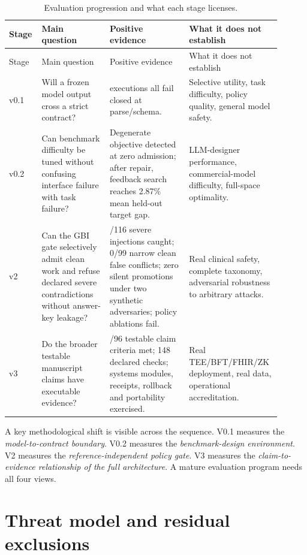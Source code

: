 \documentclass[11pt]{article}
\begin{document}
\small
\begin{longtable}{>{\RaggedRight\arraybackslash}p{0.10\linewidth} >{\RaggedRight\arraybackslash}p{0.24\linewidth} >{\RaggedRight\arraybackslash}p{0.28\linewidth} >{\RaggedRight\arraybackslash}p{0.28\linewidth}}
\caption{Evaluation progression and what each stage licenses.}\\
\toprule
Stage & Main question & Positive evidence & What it does not establish\\
\midrule
\endfirsthead
\toprule
Stage & Main question & Positive evidence & What it does not establish\\
\midrule
\endhead
v0.1 & Will a frozen model output cross a strict contract? & 768 executions all fail closed at parse/schema. & Selective utility, task difficulty, policy quality, general model safety.\\
\addlinespace
v0.2 & Can benchmark difficulty be tuned without confusing interface failure with task failure? & Degenerate objective detected at zero admission; after repair, feedback search reaches 2.87\% mean held-out target gap. & LLM-designer performance, commercial-model difficulty, full-space optimality.\\
\addlinespace
v2 & Can the GBI gate selectively admit clean work and refuse declared severe contradictions without answer-key leakage? & 116/116 severe injections caught; 0/99 narrow clean false conflicts; zero silent promotions under two synthetic adversaries; policy ablations fail. & Real clinical safety, complete taxonomy, adversarial robustness to arbitrary attacks.\\
\addlinespace
v3 & Do the broader testable manuscript claims have executable evidence? & 95/96 testable claim criteria met; 148 declared checks; systems modules, receipts, rollback and portability exercised. & Real TEE/BFT/FHIR/ZK deployment, real data, operational accreditation.\\
\bottomrule
\end{longtable}

A key methodological shift is visible across the sequence. V0.1 measures the \emph{model-to-contract boundary}. V0.2 measures the \emph{benchmark-design environment}. V2 measures the \emph{reference-independent policy gate}. V3 measures the \emph{claim-to-evidence relationship of the full architecture}. A mature evaluation program needs all four views.

\section{Threat model and residual exclusions}
\label{sec:threat-model}
\end{document}
